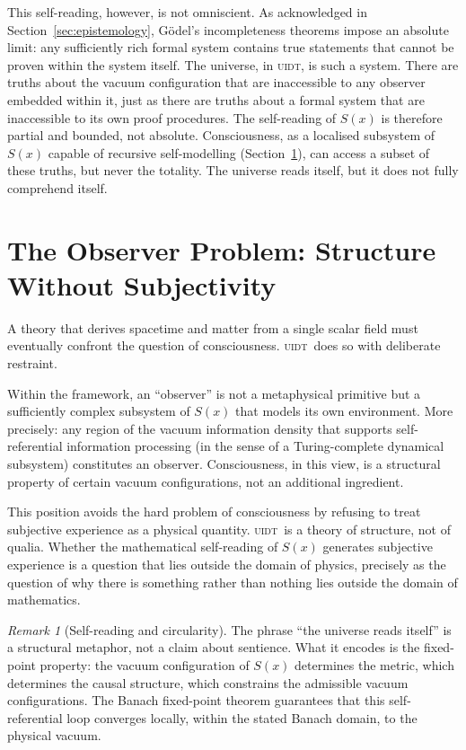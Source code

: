 \documentclass[12pt,a4paper,twoside]{article}
\theoremstyle{plain}
\theoremstyle{definition}
\theoremstyle{remark}
\newtheorem{remark}[theorem]{Remark}
\newcommand{\UIDT}{\textsc{uidt}}
\newcommand{\Sx}{S(x)}
\begin{document}
This self-reading, however, is not omniscient. As acknowledged in
Section~\ref{sec:epistemology}, G\"odel's incompleteness theorems impose an
absolute limit: any sufficiently rich formal system contains true statements
that cannot be proven within the system itself. The universe, in \UIDT, is such
a system. There are truths about the vacuum configuration that are inaccessible
to any observer embedded within it, just as there are truths about a formal
system that are inaccessible to its own proof procedures. The self-reading of
$S(x)$ is therefore partial and bounded, not absolute. Consciousness, as a
localised subsystem of $S(x)$ capable of recursive self-modelling (Section~\ref{sec:consciousness}),
can access a subset of these truths, but never the totality. The universe reads
itself, but it does not fully comprehend itself.

\section{The Observer Problem: Structure Without Subjectivity}
\label{sec:consciousness}

A theory that derives spacetime and matter from a single scalar field must
eventually confront the question of consciousness. \UIDT\ does so with
deliberate restraint.

Within the framework, an ``observer'' is not a metaphysical primitive but a
sufficiently complex subsystem of $\Sx$ that models its own environment. More
precisely: any region of the vacuum information density that supports
self-referential information processing (in the sense of a Turing-complete
dynamical subsystem) constitutes an observer. Consciousness, in this view,
is a structural property of certain vacuum configurations, not an additional
ingredient.

This position avoids the hard problem of consciousness by refusing to
treat subjective experience as a physical quantity. \UIDT\ is a theory of
structure, not of qualia. Whether the mathematical self-reading of $\Sx$
generates subjective experience is a question that lies outside the domain of
physics, precisely as the question of why there is something rather than
nothing lies outside the domain of mathematics.

\begin{remark}[Self-reading and circularity]
The phrase ``the universe reads itself'' is a structural metaphor, not a
claim about sentience. What it encodes is the fixed-point property: the
vacuum configuration of $\Sx$ determines the metric, which determines the
causal structure, which constrains the admissible vacuum configurations.
The Banach fixed-point theorem guarantees that this self-referential loop
converges locally, within the stated Banach domain, to the physical vacuum.
\end{remark}
\end{document}
